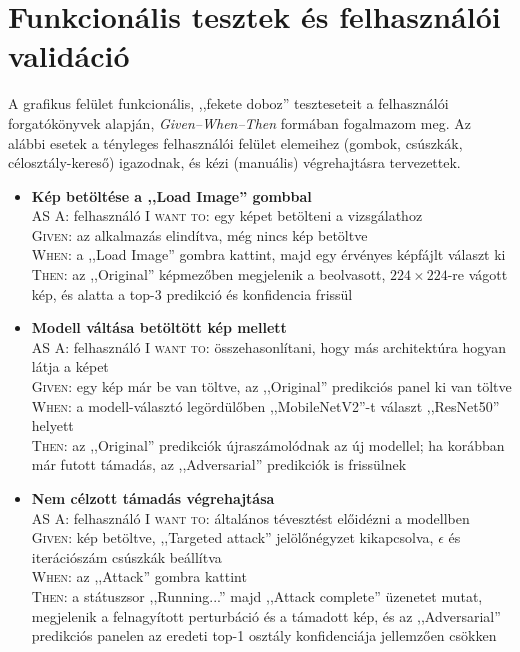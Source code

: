 \section{Funkcionális tesztek és felhasználói validáció}

A grafikus felület funkcionális, ,,fekete doboz'' teszteseteit a felhasználói forgatókönyvek alapján, \textit{Given--When--Then} 
formában fogalmazom meg. 
Az alábbi esetek a tényleges felhasználói felület elemeihez (gombok, csúszkák, célosztály-kereső) igazodnak, és kézi 
(manuális) végrehajtásra tervezettek. 

\begin{itemize}
  \item \textbf{Kép betöltése a ,,Load Image'' gombbal}\\ 
    AS A: felhasználó \textsc{I want to}: egy képet betölteni a vizsgálathoz\\ 
    \textsc{Given}: az alkalmazás elindítva, még nincs kép betöltve\\ 
    \textsc{When}: a ,,Load Image'' gombra kattint, majd egy érvényes képfájlt választ ki\\ 
    \textsc{Then}: az ,,Original'' képmezőben megjelenik a beolvasott, $224\times224$-re vágott kép, és alatta a top-3 predikció 
    és konfidencia frissül 

  \item \textbf{Modell váltása betöltött kép mellett}\\ 
    AS A: felhasználó \textsc{I want to}: összehasonlítani, hogy más architektúra hogyan látja a képet\\ 
    \textsc{Given}: egy kép már be van töltve, az ,,Original'' predikciós panel ki van töltve\\ 
    \textsc{When}: a modell-választó legördülőben ,,MobileNetV2''-t választ ,,ResNet50'' helyett\\ 
    \textsc{Then}: az ,,Original'' predikciók újraszámolódnak az új modellel; ha korábban már futott támadás, az ,,Adversarial'' 
    predikciók is frissülnek 

  \item \textbf{Nem célzott támadás végrehajtása}\\ 
    AS A: felhasználó \textsc{I want to}: általános tévesztést előidézni a modellben\\ 
    \textsc{Given}: kép betöltve, ,,Targeted attack'' jelölőnégyzet kikapcsolva, $\epsilon$ és iterációszám csúszkák beállítva\\ 
    \textsc{When}: az ,,Attack'' gombra kattint\\ 
    \textsc{Then}: a státuszsor ,,Running...'' majd ,,Attack complete'' üzenetet mutat, megjelenik a felnagyított perturbáció és 
    a támadott kép, és az ,,Adversarial'' predikciós panelen az eredeti top-1 osztály konfidenciája jellemzően csökken 


\end{itemize}
